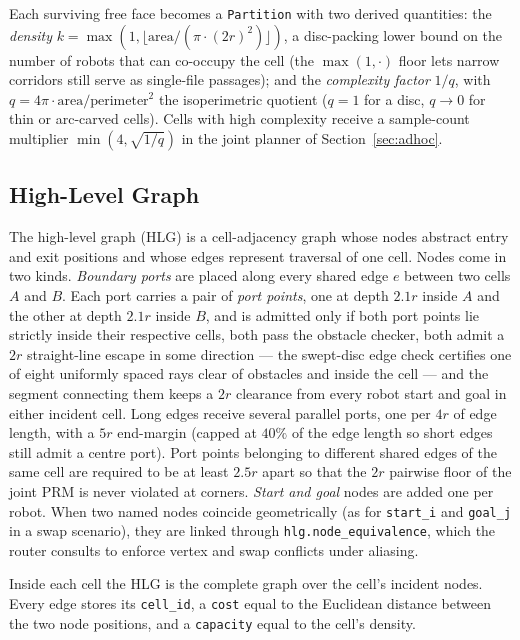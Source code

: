 \documentclass[12pt,a4paper]{article}
\begin{document}
    Each surviving free face becomes a \texttt{Partition} with two derived quantities: the \emph{density} $k=\max(1,\lfloor \text{area}/(\pi\cdot(2r)^2)\rfloor)$, a disc-packing lower bound on the number of robots that can co-occupy the cell (the $\max(1,\cdot)$ floor lets narrow corridors still serve as single-file passages); and the \emph{complexity factor} $1/q$, with $q=4\pi\cdot\text{area}/\text{perimeter}^2$ the isoperimetric quotient ($q=1$ for a disc, $q\!\to\!0$ for thin or arc-carved cells). Cells with high complexity receive a sample-count multiplier $\min(4,\sqrt{1/q})$ in the joint planner of Section~\ref{sec:adhoc}.

    \subsection{High-Level Graph}
    \label{sec:hlg}
    The high-level graph (HLG) is a cell-adjacency graph whose nodes abstract entry and exit positions and whose edges represent traversal of one cell. Nodes come in two kinds. \emph{Boundary ports} are placed along every shared edge $e$ between two cells $A$ and $B$. Each port carries a pair of \emph{port points}, one at depth $2.1r$ inside $A$ and the other at depth $2.1r$ inside $B$, and is admitted only if both port points lie strictly inside their respective cells, both pass the obstacle checker, both admit a $2r$ straight-line escape in some direction --- the swept-disc edge check certifies one of eight uniformly spaced rays clear of obstacles and inside the cell --- and the segment connecting them keeps a $2r$ clearance from every robot start and goal in either incident cell. Long edges receive several parallel ports, one per $4r$ of edge length, with a $5r$ end-margin (capped at $40\%$ of the edge length so short edges still admit a centre port). Port points belonging to different shared edges of the same cell are required to be at least $2.5r$ apart so that the $2r$ pairwise floor of the joint PRM is never violated at corners. \emph{Start and goal} nodes are added one per robot. When two named nodes coincide geometrically (as for \texttt{start\_i} and \texttt{goal\_j} in a swap scenario), they are linked through \texttt{hlg.node\_equivalence}, which the router consults to enforce vertex and swap conflicts under aliasing.

    Inside each cell the HLG is the complete graph over the cell's incident nodes. Every edge stores its \texttt{cell\_id}, a \texttt{cost} equal to the Euclidean distance between the two node positions, and a \texttt{capacity} equal to the cell's density.
\end{document}
